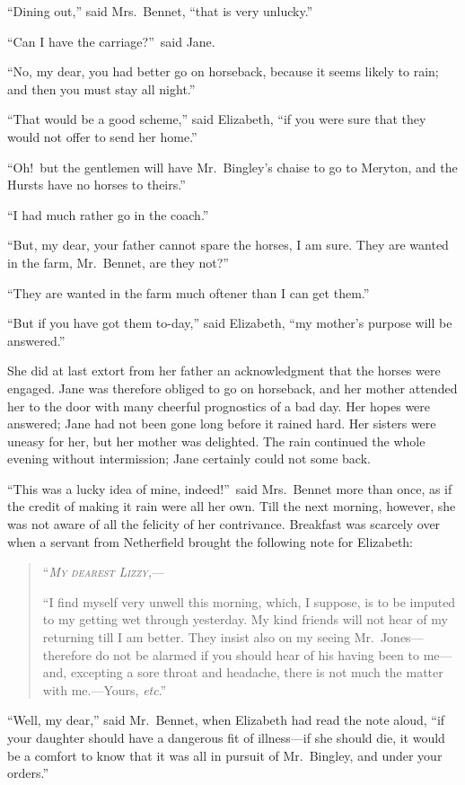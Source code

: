 \documentclass[12pt,english,oneside]{book}
\newcommand{\noun}[1]{\textsc{#1}}
\begin{document}
{}``Dining out,'' said Mrs.\ Bennet, {}``that is very unlucky.''

{}``Can I have the carriage?''\ said Jane.

{}``No, my dear, you had better go on horseback, because it seems
likely to rain; and then you must stay all night.''

{}``That would be a good scheme,'' said Elizabeth, {}``if you were
sure that they would not offer to send her home.''

{}``Oh!\ but the gentlemen will have Mr.\ Bingley's chaise to go
to Meryton, and the Hursts have no horses to theirs.''

{}``I had much rather go in the coach.''

{}``But, my dear, your father cannot spare the horses, I am sure.
They are wanted in the farm, Mr.\ Bennet, are they not?''\ 

{}``They are wanted in the farm much oftener than I can get them.''

{}``But if you have got them to-day,'' said Elizabeth, {}``my mother's
purpose will be answered.''

She did at last extort from her father an acknowledgment that the
horses were engaged. Jane was therefore obliged to go on horseback,
and her mother attended her to the door with many cheerful prognostics
of a bad day. Her hopes were answered; Jane had not been gone long
before it rained hard. Her sisters were uneasy for her, but her mother
was delighted. The rain continued the whole evening without intermission;
Jane certainly could not some back.

{}``This was a lucky idea of mine, indeed!''\ said Mrs.\ Bennet
more than once, as if the credit of making it rain were all her own.
Till the next morning, however, she was not aware of all the felicity
of her contrivance. Breakfast was scarcely over when a servant from
Netherfield brought the following note for Elizabeth:

\begin{quotation}
\noindent {}``\textit{\emph{\noun{My}}} \textit{\emph{\noun{dearest}}}
\textit{\emph{\noun{Lizzy}}}\emph{\noun{,}}---

{}``I find myself very unwell this morning, which, I suppose, is
to be imputed to my getting wet through yesterday. My kind friends
will not hear of my returning till I am better. They insist also on
my seeing Mr.\ Jones\mbox{---}therefore do not be alarmed if you
should hear of his having been to me\mbox{---}and, excepting a sore
throat and headache, there is not much the matter with me.\mbox{---}Yours,
\textit{etc}.'' 
\end{quotation}
{}``Well, my dear,'' said Mr.\ Bennet, when Elizabeth had read
the note aloud, {}``if your daughter should have a dangerous fit
of illness\mbox{---}if she should die, it would be a comfort to know
that it was all in pursuit of Mr.\ Bingley, and under your orders.''
\end{document}
